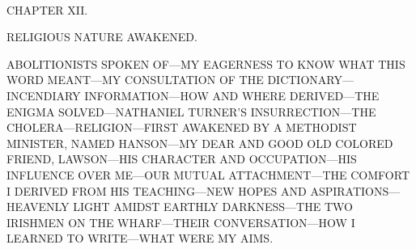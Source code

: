 {}

~

{CHAPTER XII.}

RELIGIOUS NATURE AWAKENED.

{ABOLITIONISTS SPOKEN OF---MY EAGERNESS TO KNOW WHAT THIS WORD
MEANT---MY CONSULTATION OF THE DICTIONARY---INCENDIARY INFORMATION---HOW
AND WHERE DERIVED---THE ENIGMA SOLVED---NATHANIEL TURNER'S
INSURRECTION---THE CHOLERA---RELIGION---FIRST AWAKENED BY A METHODIST
MINISTER, NAMED HANSON---MY DEAR AND GOOD OLD COLORED FRIEND,
LAWSON---HIS CHARACTER AND OCCUPATION---HIS INFLUENCE OVER ME---OUR
MUTUAL ATTACHMENT---THE COMFORT I DERIVED FROM HIS TEACHING---NEW HOPES
AND ASPIRATIONS---HEAVENLY LIGHT AMIDST EARTHLY DARKNESS---THE TWO
IRISHMEN ON THE WHARF---THEIR CONVERSATION---HOW I LEARNED TO
WRITE---WHAT WERE MY AIMS.}

